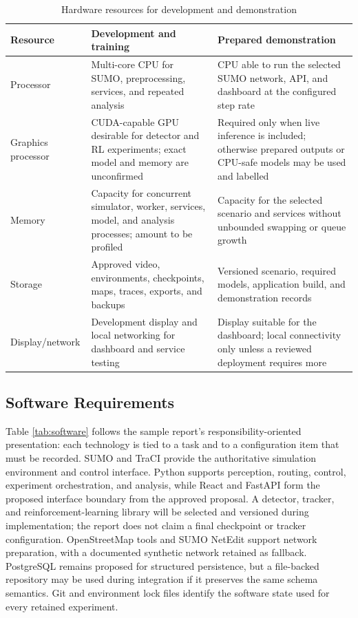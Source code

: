 \begin{table}[htbp]
\centering
\caption{Hardware resources for development and demonstration}
\label{tab:hardware}
\begin{tabularx}{\textwidth}{p{}YY}
\toprule
\textbf{Resource} & \textbf{Development and training} & \textbf{Prepared demonstration}\\
\midrule
Processor & Multi-core CPU for SUMO, preprocessing, services, and repeated analysis & CPU able to run the selected SUMO network, API, and dashboard at the configured step rate\\
Graphics processor & CUDA-capable GPU desirable for detector and RL experiments; exact model and memory are unconfirmed & Required only when live inference is included; otherwise prepared outputs or CPU-safe models may be used and labelled\\
Memory & Capacity for concurrent simulator, worker, services, model, and analysis processes; amount to be profiled & Capacity for the selected scenario and services without unbounded swapping or queue growth\\
Storage & Approved video, environments, checkpoints, maps, traces, exports, and backups & Versioned scenario, required models, application build, and demonstration records\\
Display/network & Development display and local networking for dashboard and service testing & Display suitable for the dashboard; local connectivity only unless a reviewed deployment requires more\\
\bottomrule
\end{tabularx}
\end{table}

\subsection{Software Requirements}

Table \ref{tab:software} follows the sample report's responsibility-oriented presentation: each technology is tied to a task and to a configuration item that must be recorded. SUMO and TraCI provide the authoritative simulation environment and control interface. Python supports perception, routing, control, experiment orchestration, and analysis, while React and FastAPI form the proposed interface boundary from the approved proposal. A detector, tracker, and reinforcement-learning library will be selected and versioned during implementation; the report does not claim a final checkpoint or tracker configuration. OpenStreetMap tools and SUMO NetEdit support network preparation, with a documented synthetic network retained as fallback. PostgreSQL remains proposed for structured persistence, but a file-backed repository may be used during integration if it preserves the same schema semantics. Git and environment lock files identify the software state used for every retained experiment.


